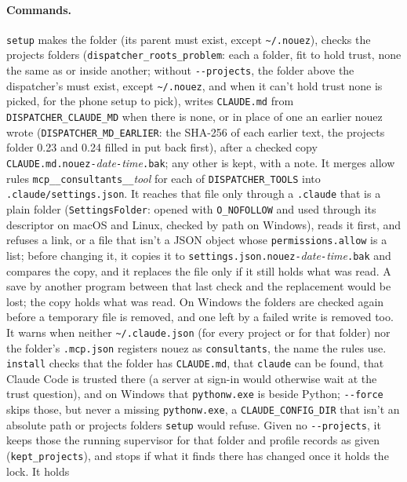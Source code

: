 \documentclass[10pt,a4paper]{article}
\newcommand{\code}[1]{\texttt{#1}}
\begin{document}
\paragraph{Commands.} \code{setup} makes the folder (its parent must exist, except
\code{\textasciitilde/.nouez}), checks the projects folders (\code{dispatcher\_roots\_problem}: each a
folder, fit to hold trust, none the same as or inside another; without \code{-{}-projects}, the folder
above the dispatcher's must exist, except \code{\textasciitilde/.nouez}, and when it can't hold trust none
is picked, for the phone setup to pick), writes
\code{CLAUDE.md} from \code{DISPATCHER\_CLAUDE\_MD} when there is none, or in place of one an
earlier nouez wrote (\code{DISPATCHER\_MD\_EARLIER}: the SHA-256 of each earlier text, the projects
folder 0.23 and 0.24 filled in put back first), after a checked copy
\code{CLAUDE.md.nouez-}\textit{date}\code{-}\textit{time}\code{.bak}; any other is kept, with a
note. It merges allow rules
\code{mcp\_\_consultants\_\_}\textit{tool} for each of \code{DISPATCHER\_TOOLS} into
\code{.claude/settings.json}. It reaches that file only through a \code{.claude} that is a
plain folder (\code{SettingsFolder}: opened with \code{O\_NOFOLLOW} and used through its descriptor
on macOS and Linux, checked by path on Windows), reads it first, and refuses a link, or a file that
isn't a JSON object whose \code{permissions.allow} is a list; before changing it, it copies it to
\code{settings.json.nouez-}\textit{date}\code{-}\textit{time}\code{.bak} and compares the copy, and
it replaces the file only if it still holds what was read. A save by another program between that
last check and the replacement would be lost; the copy holds what was read. On Windows the folders
are checked again before a temporary file is removed, and one left by a failed write is removed too.
It warns when neither \code{\textasciitilde/.claude.json} (for every project or for that folder)
nor the folder's \code{.mcp.json} registers nouez as \code{consultants}, the name the rules use. \code{install} checks that the folder has \code{CLAUDE.md}, that
\code{claude} can be found, that Claude Code is trusted there (a server at sign-in would
otherwise wait at the trust question), and on Windows that \code{pythonw.exe} is beside Python;
\code{-{}-force} skips those, but never a missing \code{pythonw.exe}, a
\code{CLAUDE\_CONFIG\_DIR} that isn't an absolute path or projects folders \code{setup} would refuse.
Given no \code{-{}-projects}, it keeps those the running supervisor for that folder and profile
records as given (\code{kept\_projects}), and stops if what it finds there has changed once it holds the lock. It holds
\end{document}

